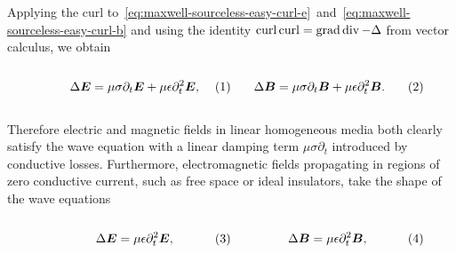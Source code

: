 \documentclass[11pt,a4paper,twoside,openany]{report}
\begin{document}
            Applying the curl to~\eqref{eq:maxwell-sourceless-easy-curl-e}~and~\eqref{eq:maxwell-sourceless-easy-curl-b} and using the identity $\operatorname{curl}\operatorname{curl} = \operatorname{grad}\operatorname{div} - \Delta$ from vector calculus, we obtain\\
            \begin{subequations}
                \label{eq:wave-equations}
                \noindent\centering
                \begin{minipage}{0.45\textwidth}
                    \begin{align}
                        \label{eq:wave-equation-e}
                        \Delta\vec E &= \mu\sigma\partial_t\vec E + \mu\epsilon\partial^2_t\vec E,
                    \end{align}
                \end{minipage}
                \hfill
                \begin{minipage}{0.45\textwidth}
                    \begin{align}
                        \label{eq:wave-equation-b}
                        \Delta\vec B &= \mu\sigma\partial_t\vec B + \mu\epsilon\partial^2_t\vec B.
                    \end{align}
                \end{minipage}\bigskip
            \end{subequations}\\
            Therefore electric and magnetic fields in linear homogeneous media both clearly satisfy the wave equation with a linear damping term $\mu\sigma\partial_t$ introduced by conductive losses. Furthermore, electromagnetic fields propagating in regions of zero conductive current, such as free space or ideal insulators, take the shape of the wave equations\\
            \begin{subequations}
                \label{eq:wave-equations-lossless}
                \noindent\centering
                \begin{minipage}{0.45\textwidth}
                    \begin{align}
                        \label{eq:wave-equation-e-lossless}
                        \Delta\vec E &= \mu\epsilon\partial^2_t\vec E,
                    \end{align}
                \end{minipage}
                \hfill
                \begin{minipage}{0.45\textwidth}
                    \begin{align}
                        \label{eq:wave-equations-b-lossless}
                        \Delta\vec B &= \mu\epsilon\partial^2_t\vec B,
                    \end{align}
                \end{minipage}\bigskip
            \end{subequations}\\
\end{document}
